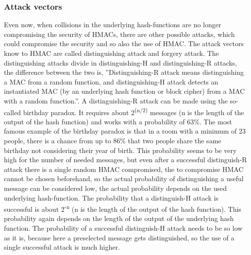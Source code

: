 \subsubsection{Attack vectors}
Even now, when collisions in the underlying hash-functions are no longer compromising the security of HMACs, there are other possible attacks, which could compromise the security and so also the use of HMAC. The attack vectors know to HMAC are called distinguishing attack and forgery attack. The distinguishing attacks divide in distinguishing-H and distinguishing-R attacks, the difference between the two is, ''Distinguishing-R attack means distinguishing a MAC from a random function, and distinguishing-H attack detects an instantiated MAC (by an underlying hash function or block cipher) from a MAC with a random function.''\cite{ATT1}. A distinguishing-R attack can be made using the so-called birthday paradox. It requires about 2\textsuperscript{(n$/$2)} messages (n is the length of the output of the hash function) and works with a probability of 63\%\cite{ATT1}. The most famous example of the birthday paradox is that in a room with a minimum of 23 people, there is a chance from up to 86\% that two people share the same birthday not considering their year of birth. This probability seems to be very high for the number of needed messages, but even after a successful distinguish-R attack there is a single random HMAC compromised, the to compromise HMAC cannot be chosen beforehand, so the actual probability of distinguishing a useful message can be considered low, the actual probability depends on the used underlying hash-function. The probability that a distinguish-H attack is successful is about 2\textsuperscript{-n}\cite{ATT1} (n is the length of the output of the hash function). This probability again depends on the length of the output of the underlying hash function. The probability of a successful distinguish-H attack needs to be so low as it is, because here a preselected message gets distinguished, so the use of a single successful attack is much higher. 
